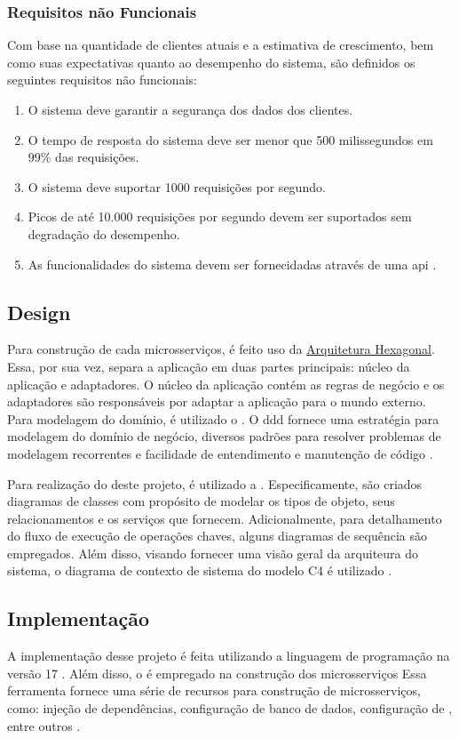 \subsubsection{Requisitos não Funcionais}
Com base na quantidade de clientes atuais e a estimativa de crescimento, bem como suas expectativas quanto ao desempenho do sistema, são definidos os seguintes requisitos não funcionais:
\begin{enumerate}
    \item O sistema deve garantir a segurança dos dados dos clientes.
    \item O tempo de resposta do sistema deve ser menor que 500 milissegundos em 99\% das requisições.
    \item O sistema deve suportar 1000 requisições por segundo.
    \item Picos de até 10.000 requisições por segundo devem ser suportados sem degradação do desempenho.
    \item As funcionalidades do sistema devem ser fornecidadas através de uma \acrshort{api} .
\end{enumerate}

\subsection{Design}
Para construção de cada microsserviços, é feito uso da \hyperref[section:hexagonal]{Arquitetura Hexagonal}. Essa, por sua vez, separa a aplicação em duas partes principais: núcleo da aplicação e adaptadores. O núcleo da aplicação contém as regras de negócio e os adaptadores são responsáveis por adaptar a aplicação para o mundo externo. Para modelagem do domínio, é utilizado o . O \acrshort{ddd} fornece uma estratégia para modelagem do domínio de negócio, diversos padrões para resolver problemas de modelagem recorrentes e facilidade de entendimento e manutenção de código \cite{evans2004ddd}.

Para realização do  deste projeto, é utilizado a . Especificamente, são criados diagramas de classes com propósito de modelar os tipos de objeto, seus relacionamentos e os serviços que fornecem. Adicionalmente, para detalhamento do fluxo de execução de operações chaves, alguns diagramas de sequência são empregados. Além disso, visando fornecer uma visão geral da arquiteura do sistema, o diagrama de contexto de sistema do modelo C4 é utilizado \cite{c4Model}. 

\subsection{Implementação}
A implementação desse projeto é feita utilizando a linguagem de programação  na versão 17 \cite{java}. Além disso, o   é empregado na construção dos microsserviços Essa ferramenta fornece uma série de recursos para construção de microsserviços, como: injeção de dependências, configuração de banco de dados, configuração de , entre outros \cite{springBoot}. 

